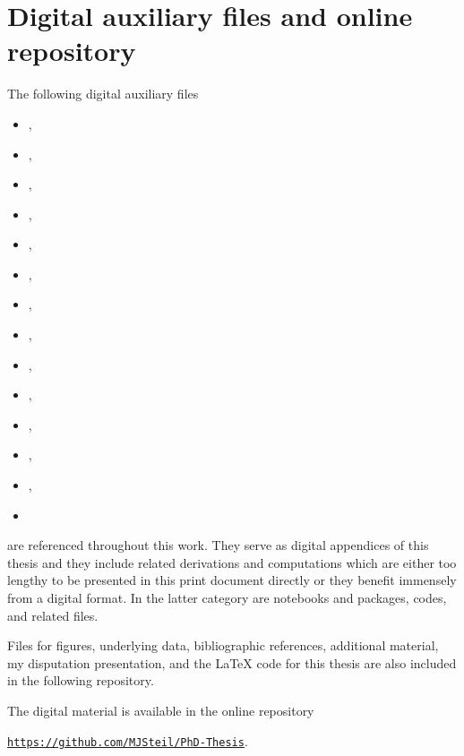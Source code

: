 \section{Digital auxiliary files and online repository}\label{app:auxFiles}
The following digital auxiliary files
\begin{itemize}[leftmargin=4.5em,align=left,itemindent=0em,labelwidth=2.5em]
	\item[\cite{Steil:2023PhDFlowEquationsNB}] ,
	\item[\cite{Steil:2023PhDFVNB}] ,
	\item[\cite{Steil:2023PhDqcd}] ,
	\item[\cite{Steil:2023zeroD}] ,
	\item[\cite{Steil:2023zeroDN1}] ,
	\item[\cite{Steil:2023zeroDlargeN}] ,
	\item[\cite{Steil:2023zeroDSU2}] ,
	\item[\cite{Steil:2023GNnotebook}] ,
	\item[\cite{Steil:2023GNcpp}] ,
	\item[\cite{Steil:2020ggl}] ,
	\item[\cite{Steil:2023qmmcdw}] ,
	\item[\cite{Steil:2023QMcpp}] ,
	\item[\cite{Steil:2020bsam}] ,
	\item[\cite{Steil:2023PhDThermodynamicsNB}] 
\end{itemize}
are referenced throughout this work.
They serve as digital appendices of this thesis and they include related derivations and computations which are either too lengthy to be presented in this print document directly or they benefit immensely from a digital format.
In the latter category are \WAM{} notebooks and packages, \Cpp{} codes, and related files.

Files for figures, underlying data, bibliographic references, additional material, my disputation presentation, and the \LaTeX{} code for this thesis are also included in the following repository.

The digital material is available in the online repository
\begin{center}
	\texttt{\smaller\href{https://github.com/MJSteil/PhD-Thesis}{https://github.com/MJSteil/PhD-Thesis}}.
\end{center}